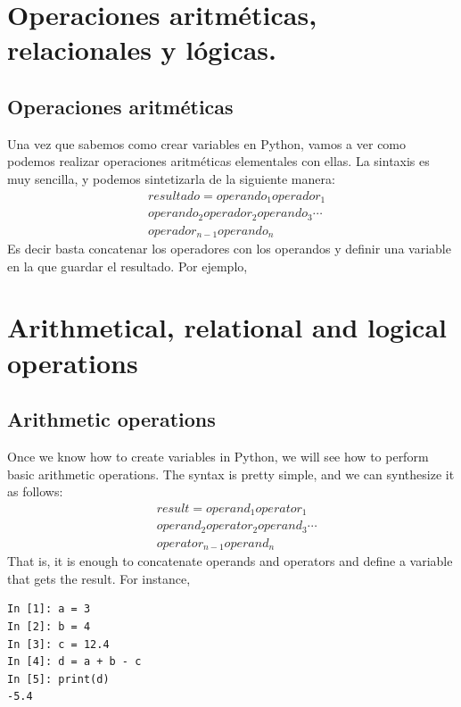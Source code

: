 \begin{paracol}{2}
\section{Operaciones aritméticas, relacionales y lógicas.}
\subsection{Operaciones aritméticas}
 Una vez que sabemos como crear variables en Python, vamos a ver como podemos realizar operaciones aritméticas elementales con ellas. La sintaxis es muy sencilla, y podemos sintetizarla de la siguiente manera:
\begin{equation*}
\begin{split}
&resultado=operando_1 operador_1\\
&operando_2 operador_2 operando_3 \cdots\\ 
&operador_{n-1} operando_n
\end{split}
\end{equation*}
Es decir basta concatenar los operadores con los operandos y definir una variable en la que guardar el resultado. Por ejemplo,
\switchcolumn
\section{Arithmetical, relational and logical operations}
\subsection{Arithmetic operations}
Once we know how to create variables in Python, we will see how to perform basic arithmetic operations. The syntax is pretty simple, and we can synthesize it as follows:
\begin{equation*}
\begin{split}
&result=operand_1 operator_1\\
&operand_2 operator_2 operand_3 \cdots\\ 
&operator_{n-1} operand_n
\end{split}
\end{equation*}
That is, it is enough to concatenate operands and operators and define a variable that gets the result. For instance, 
\end{paracol}

\begin{center}
    \begin{minipage}{.4\textwidth}
\begin{verbatim}
In [1]: a = 3
In [2]: b = 4
In [3]: c = 12.4
In [4]: d = a + b - c
In [5]: print(d)
-5.4    
\end{verbatim}        
    \end{minipage}
\end{center}

